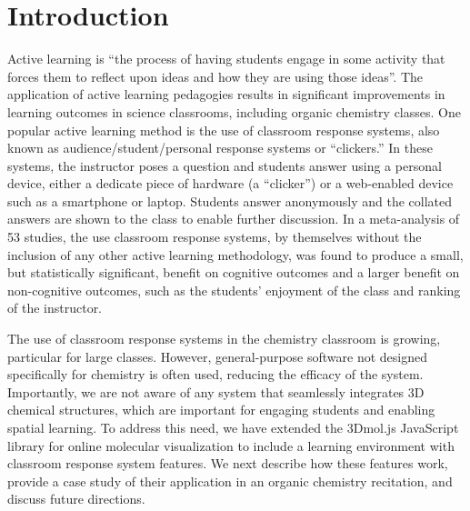 \documentclass[journal=jceda8,manuscript=article]{achemso}
\begin{document}
\section{Introduction}
Active learning is ``the process of having students engage in some activity that forces them to reflect upon ideas and how they are using those ideas''\cite{collins2011greenwood}.  The application of active learning pedagogies results in significant improvements in learning outcomes in science classrooms\cite{michael2006s,deslauriers2011improved,armbruster2009active}, including organic chemistry classes\cite{jeske2019collaborative,decicco2019clickers,webbased}.  One popular active learning method is the use of classroom response systems\cite{martyn2007clickers}, also known as audience/student/personal response systems or ``clickers.''  In these systems, the instructor poses a question and students answer using a personal device, either a dedicate piece of hardware (a ``clicker'') or a web-enabled device such as a smartphone or laptop\cite{webbased}.  Students answer anonymously and the collated answers are shown to the class to enable further discussion.  In a meta-analysis\cite{hunsu2016meta} of 53 studies, the use classroom response systems, by themselves without the inclusion of any other active learning methodology, was found to produce a small, but statistically significant, benefit on cognitive outcomes and a larger benefit on non-cognitive outcomes, such as the students' enjoyment of the class and ranking of the instructor.

The use of classroom response systems in the chemistry classroom is growing, particular for large classes\cite{gibbons2017chasm,woelk2008optimizing}.  However, general-purpose software not designed specifically for chemistry is often used, reducing the efficacy of the system\cite{webbased}.  Importantly, we are not aware of any system that seamlessly integrates 3D chemical structures, which are important for engaging students and enabling spatial learning\cite{viz32class}.  To address this need, we have extended the 3Dmol.js\cite{rego20153dmol} JavaScript library for online molecular visualization to include a learning environment with classroom response system features.  We next describe how these features work, provide a case study of their application in an organic chemistry recitation, and discuss future directions.
\end{document}

